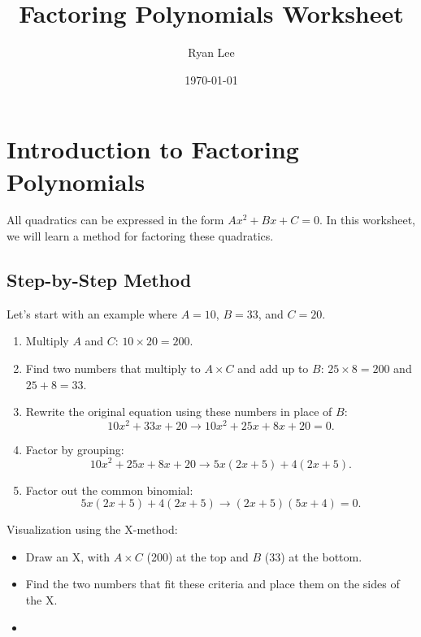 \documentclass[12pt]{article}
\title{Factoring Polynomials Worksheet}
\author{Ryan Lee}
\date{\today}
\begin{document}
\maketitle

\section*{Introduction to Factoring Polynomials}

All quadratics can be expressed in the form $Ax^2 + Bx + C = 0$. In this worksheet, we will learn a method for factoring these quadratics.

\subsection*{Step-by-Step Method}

Let's start with an example where $A=10$, $B=33$, and $C=20$.

\begin{enumerate}
    \item Multiply $A$ and $C$: $10 \times 20 = 200$.
    \item Find two numbers that multiply to $A \times C$ and add up to $B$: $25 \times 8 = 200$ and $25 + 8 = 33$.
    \item Rewrite the original equation using these numbers in place of $B$: 
    \[
    10x^2 + 33x + 20 \rightarrow 10x^2 + 25x + 8x + 20 = 0.
    \]
    \item Factor by grouping: 
    \[
    10x^2 + 25x + 8x + 20 \rightarrow 5x(2x + 5) + 4(2x + 5).
    \]
    \item Factor out the common binomial: 
    \[
    5x(2x + 5) + 4(2x + 5) \rightarrow (2x + 5)(5x + 4) = 0.
    \]
\end{enumerate}
Visualization using the X-method:
\begin{itemize}
    \item Draw an X, with $A \times C$ (200) at the top and $B$ (33) at the bottom.
    \item Find the two numbers that fit these criteria and place them on the sides of the X.
    \item 
        \begin{center}
        \end{center}
\end{itemize}
\end{document}
